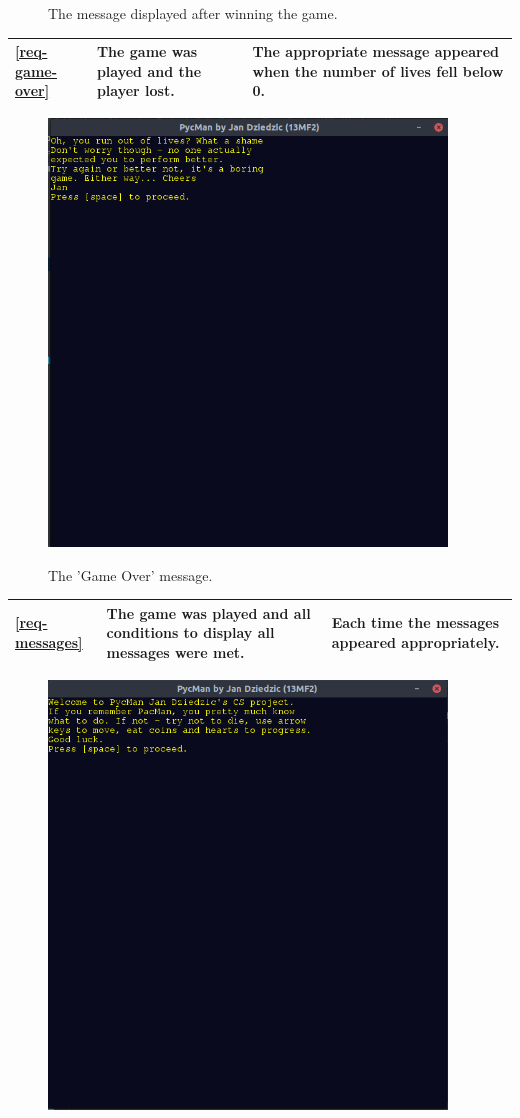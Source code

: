 \documentclass[11pt,a4paper,notitlepage]{report}
\newenvironment{img}{
	\begin{center}
		\begin{figure}[H]
			\begin{center}
			
}{
	\end{center}
		\end{figure}
			\end{center}
}
\begin{document}
\begin{center}
\begin{img}
					\caption{The message displayed after winning the game.}
				\end{img}
				\begin{longtable}{ | p{2cm} | p{5cm} | p{4cm} |}
					\hline	
					\ref{req-game-over}&The game was played and the player lost.&The appropriate message appeared when the number of lives fell below 0.\\ \hline
				\end{longtable}
				\begin{img}
					\includegraphics[width=300pt]{images/game_over_msg.png}\\
					\caption{The 'Game Over' message.}
				\end{img}
				\begin{longtable}{ | p{2cm} | p{5cm} | p{4cm} |}
					\hline	
					\ref{req-messages}&The game was played and all conditions to display all messages were met.&Each time the messages appeared appropriately.\\ \hline
				\end{longtable}	
				\begin{img}
					\includegraphics[width=300pt]{images/tutorial.png}\\

\end{img}
\end{center}
\end{document}
